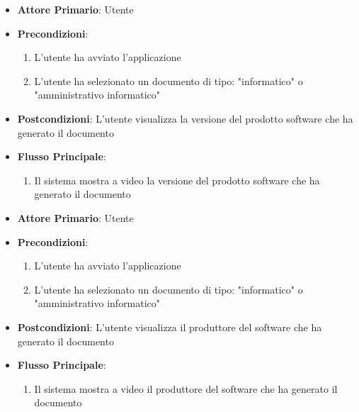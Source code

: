 \begin{itemize}
    \item \textbf{Attore Primario}: Utente
    \item \textbf{Precondizioni}:
    \begin{enumerate}
        \item L'utente ha avviato l'applicazione
        \item L'utente ha selezionato un documento di tipo: "informatico" o "amministrativo informatico"
    \end{enumerate}
    \item \textbf{Postcondizioni}: L'utente visualizza la versione del prodotto software che ha generato il documento
    \item \textbf{Flusso Principale}:
        \begin{enumerate}
         \item Il sistema mostra a video la versione del prodotto software che ha generato il documento
    \end{enumerate}
\end{itemize}

\begin{itemize}
    \item \textbf{Attore Primario}: Utente
    \item \textbf{Precondizioni}:
    \begin{enumerate}
        \item L'utente ha avviato l'applicazione
        \item L'utente ha selezionato un documento di tipo: "informatico" o "amministrativo informatico"
    \end{enumerate}
    \item \textbf{Postcondizioni}: L'utente visualizza il produttore del software che ha generato il documento
    \item \textbf{Flusso Principale}:
        \begin{enumerate}
         \item Il sistema mostra a video il produttore del software che ha generato il documento
    \end{enumerate}
\end{itemize}

